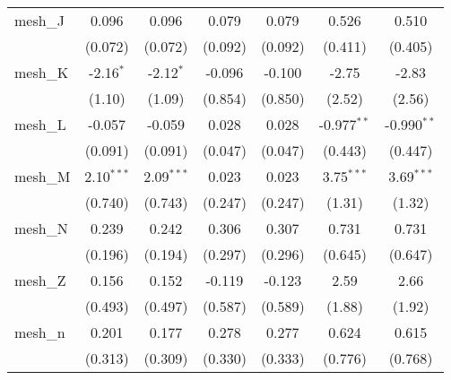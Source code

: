 \begin{tabular}{lcccccc}
   mesh\_J                                                     & 0.096          & 0.096         & 0.079         & 0.079         & 0.526         & 0.510\\   
                                                               & (0.072)        & (0.072)       & (0.092)       & (0.092)       & (0.411)       & (0.405)\\   
   mesh\_K                                                     & -2.16$^{*}$    & -2.12$^{*}$   & -0.096        & -0.100        & -2.75         & -2.83\\   
                                                               & (1.10)         & (1.09)        & (0.854)       & (0.850)       & (2.52)        & (2.56)\\   
   mesh\_L                                                     & -0.057         & -0.059        & 0.028         & 0.028         & -0.977$^{**}$ & -0.990$^{**}$\\   
                                                               & (0.091)        & (0.091)       & (0.047)       & (0.047)       & (0.443)       & (0.447)\\   
   mesh\_M                                                     & 2.10$^{***}$   & 2.09$^{***}$  & 0.023         & 0.023         & 3.75$^{***}$  & 3.69$^{***}$\\   
                                                               & (0.740)        & (0.743)       & (0.247)       & (0.247)       & (1.31)        & (1.32)\\   
   mesh\_N                                                     & 0.239          & 0.242         & 0.306         & 0.307         & 0.731         & 0.731\\   
                                                               & (0.196)        & (0.194)       & (0.297)       & (0.296)       & (0.645)       & (0.647)\\   
   mesh\_Z                                                     & 0.156          & 0.152         & -0.119        & -0.123        & 2.59          & 2.66\\   
                                                               & (0.493)        & (0.497)       & (0.587)       & (0.589)       & (1.88)        & (1.92)\\   
   mesh\_n                                                     & 0.201          & 0.177         & 0.278         & 0.277         & 0.624         & 0.615\\   
                                                               & (0.313)        & (0.309)       & (0.330)       & (0.333)       & (0.776)       & (0.768)\\   

\end{tabular}

